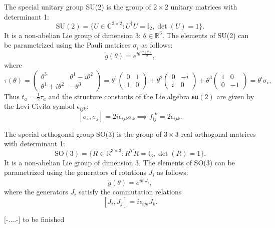 \begin{example}
    The special unitary group SU(2) is the group of \(2 \times 2\) unitary matrices with determinant 1:
    \[
        \mathrm{SU}(2) = \{ U \in \mathbb{C}^{2 \times 2} : U^\dagger U = \mathbb{I}_2, \det(U) = 1 \}.
    \]
    It is a non-abelian Lie group of dimension 3: \(\underline{\theta} \in \mathbb{R}^3\). The elements of SU(2) can be parametrized using the Pauli matrices \(\sigma_i\) as follows:
    \[
        \tilde{g}(\theta) = e^{i \theta^i \frac{\tau(\theta)}{2}},
    \]
    where
    \[
        \tau(\theta) = \begin{pmatrix}
            \theta^3              & \theta^1 - i \theta^2 \\
            \theta^1 + i \theta^2 & -\theta^3
        \end{pmatrix} = \theta^1 \begin{pmatrix}
            0 & 1 \\
            1 & 0
        \end{pmatrix} + \theta^2 \begin{pmatrix}
            0 & -i \\
            i & 0
        \end{pmatrix} + \theta^3 \begin{pmatrix}
            1 & 0  \\
            0 & -1
        \end{pmatrix} = \theta^i \sigma_i,
    \]
    Thus \(t_a = \frac{1}{2}\tau_a\) and the structure constants of the Lie algebra \(\mathfrak{su}(2)\) are given by the Levi-Civita symbol \(\epsilon_{ijk}\):
    \[
        [\sigma_i, \sigma_j] = 2i \epsilon_{ijk} \sigma_k \implies f_{ij}^{\ \ k} = 2 \epsilon_{ijk}.
    \]
\end{example}

\begin{example}
    The special orthogonal group SO(3) is the group of \(3 \times 3\) real orthogonal matrices with determinant 1:
    \[
        \mathrm{SO}(3) = \{ R \in \mathbb{R}^{3 \times 3} : R^T R = \mathbb{I}_3, \det(R) = 1 \}.
    \]
    It is a non-abelian Lie group of dimension 3. The elements of SO(3) can be parametrized using the generators of rotations \(J_i\) as follows:
    \[
        \tilde{g}(\theta) = e^{i \theta^i J_i},
    \]
    where the generators \(J_i\) satisfy the commutation relations
    \[
        [J_i, J_j] = i \epsilon_{ijk} J_k.
    \]

    [-....-] to be finished
\end{example}